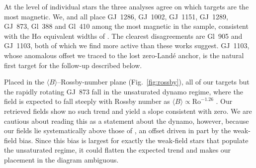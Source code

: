 
At the level of individual stars the three analyses agree on which targets are the most magnetic. We, \citet{reiners+2022} and \citet{cristofari_2023b} all place GJ~1286, GJ~1002, GJ~1151, GJ~1289, GJ~873, Gl~388 and Gl~410 among the most magnetic in the sample, consistent with the H$\alpha$ equivalent widths of \citet{Schofer_2019}. The clearest disagreements are Gl~905 and GJ~1103, both of which we find more active than these works suggest. GJ~1103, whose anomalous offset we traced to the lost zero-Landé anchor, is the natural first target for the follow-up described below.

Placed in the $\langle B\rangle$--Rossby-number plane (Fig.~\ref{fig:rossby}), all of our targets but the rapidly rotating GJ~873 fall in the unsaturated dynamo regime, where the field is expected to fall steeply with Rossby number as $\langle B\rangle\propto\mathrm{Ro}^{-1.26}$ \citep{reiners+2022}. Our retrieved fields show no such trend and yield a slope consistent with zero. We are cautious about reading this as a statement about the dynamo, however, because our fields lie systematically above those of \citet{reiners+2022}, an offset driven in part by the weak-field bias. Since this bias is largest for exactly the weak-field stars that populate the unsaturated regime, it could flatten the expected trend and makes our placement in the diagram ambiguous.

